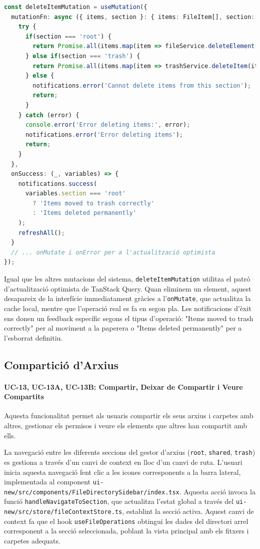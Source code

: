 \begin{lstlisting}[language=typescript, caption={Lògica dual de la mutació d'eliminació a `useFileOperations.ts`}]
const deleteItemMutation = useMutation({
  mutationFn: async ({ items, section }: { items: FileItem[], section: 'root' | 'trash' | 'shared' }) => {
    try {
      if(section === 'root') {
        return Promise.all(items.map(item => fileService.deleteElement(item.id!.toString())));
      } else if(section === 'trash') {
        return Promise.all(items.map(item => trashService.deleteItem(item.id!.toString())));
      } else {
        notifications.error('Cannot delete items from this section');
        return;
      }
    } catch (error) {
      console.error('Error deleting items:', error);
      notifications.error('Error deleting items');
      return;
    }
  },
  onSuccess: (_, variables) => {
    notifications.success(
      variables.section === 'root' 
        ? 'Items moved to trash correctly'
        : 'Items deleted permanently'
    );
    refreshAll();
  }
  // ... onMutate i onError per a l'actualització optimista
});
\end{lstlisting}

Igual que les altres mutacions del sistema, \texttt{deleteItemMutation} utilitza el patró d'actualització optimista de TanStack Query. Quan eliminem un element, aquest desapareix de la interfície immediatament gràcies a l'\texttt{onMutate}, que actualitza la cache local, mentre que l'operació real es fa en segon pla. Les notificacions d'èxit ens donen un feedback específic segons el tipus d'operació: "Items moved to trash correctly" per al moviment a la paperera o "Items deleted permanently" per a l'esborrat definitiu.

\subsection{Compartició d'Arxius}
\paragraph{UC-13, UC-13A, UC-13B: Compartir, Deixar de Compartir i Veure Compartits}
Aquesta funcionalitat permet als usuaris compartir els seus arxius i carpetes amb altres, gestionar els permisos i veure els elements que altres han compartit amb ells.

La navegació entre les diferents seccions del gestor d'arxius (\texttt{root}, \texttt{shared}, \texttt{trash}) es gestiona a través d'un canvi de context en lloc d'un canvi de ruta. L'usuari inicia aquesta navegació fent clic a les icones corresponents a la barra lateral, implementada al component \texttt{ui-new/src/components/FileDirectorySidebar/index.tsx}. Aquesta acció invoca la funció \texttt{handleNavigateToSection}, que actualitza l'estat global a través del \texttt{ui-new/src/store/fileContextStore.ts}, establint la secció activa. Aquest canvi de context fa que el hook \texttt{useFileOperations} obtingui les dades del directori arrel corresponent a la secció seleccionada, poblant la vista principal amb els fitxers i carpetes adequats.

